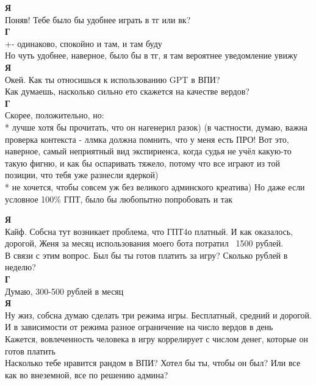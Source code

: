 \textbf{Я} \\
Поняв! Тебе было бы удобнее играть в тг или вк?\\

\textbf{Г} \\
+- одинаково, спокойно и там, и там буду\\

Но чуть удобнее, наверное, было бы в тг, я там вероятнее уведомление увижу\\

\textbf{Я} \\
Окей. Как ты относишься к использованию GPT в ВПИ? \\
Как думаешь, насколько сильно ето скажется на качестве вердов?\\

\textbf{Г} \\
Скорее, положительно, но: \\
* лучше хотя бы прочитать, что он нагенерил разок) (в частности, думаю, важна проверка контекста - ллмка должна помнить, что у меня есть ПРО! Вот это, наверное, самый неприятный вид экспириенса, когда судья не учёл какую-то такую фигню, и как бы оспаривать тяжело, потому что все играют из той позиции, что тебя уже разнесли ядеркой) \\
* не хочется, чтобы совсем уж без великого админского креатива) Но даже если условное 100\% ГПТ, было бы любопытно попробовать и так

\textbf{Я} \\
Кайф. Собсна тут возникает проблема, что ГПТ4о платный. И как оказалось, дорогой, Женя за месяц использования моего бота потратил ~1500 рублей.\\

В связи с этим вопрос. Был бы ты готов платить за игру? Сколько рублей в неделю?\\

\textbf{Г} \\
Думаю, 300-500 рублей в месяц\\

\textbf{Я} \\
Ну жиз, собсна думаю сделать три режима игры. Бесплатный, средний и дорогой. И в зависимости от режима разное ограничение на число вердов в день\\

Кажется, вовлеченность человека в игру коррелирует с числом денег, которые он готов платить\\

Насколько тебе нравится рандом в ВПИ? Хотел бы ты, чтобы он был? Или все как во внеземной, все по решению админа?\\

